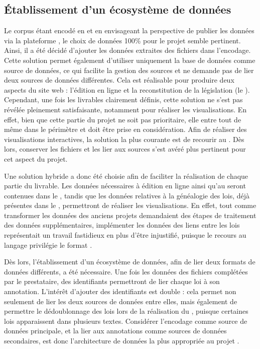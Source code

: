 \subsection{Établissement d’un écosystème de données}

Le corpus étant encodé en \XML et en envisageant la perspective de publier les données via la plateforme \tp, le choix de données 100\% \XML pour le projet semble pertinent. Ainsi, il a été décidé d'ajouter les données extraites des fichiers \JSON dans l'encodage. Cette solution permet également d'utiliser uniquement la base de données \XML comme source de données, ce qui facilite la gestion des sources et ne demande pas de lier deux sources de données différentes. Cela est réalisable pour produire deux aspects du site web : l'édition en ligne et la reconstitution de la législation (le \cv). Cependant, une fois les livrables clairement définis, cette solution ne s'est pas révélée pleinement satisfaisante, notamment pour réaliser les visualisations. En effet, bien que cette partie du projet ne soit pas prioritaire, elle entre tout de même dans le périmètre et doit être prise en considération. Afin de réaliser des visualisations interactives, la solution la plus courante est de recourir au \JS. Dès lors, conserver les fichiers \JSON et les lier aux sources \XML s'est avéré plus pertinent pour cet aspect du projet. 

Une solution hybride a donc été choisie afin de faciliter la réalisation de chaque partie du livrable. Les données nécessaires à édition en ligne ainsi qu'au \cv seront contenues dans le \XML, tandis que les données relatives à la généalogie des lois, déjà présentes dans le \JSON, permettront de réaliser les visualisations. En effet, tout comme transformer les données des anciens projets demandaient des étapes de traitement des données supplémentaires, implémenter les données des liens entre les lois représentait un travail fastidieux en plus d'être injustifié, puisque le recours au langage \JS privilégie le format \JSON. 

Dès lors, l'établissement d'un écosystème de données, afin de lier deux formats de données différents, a été nécessaire. Une fois les données des fichiers \JSON complétées par le prestataire, des identifiants permettront de lier chaque loi à son annotation. L'intérêt d'ajouter des identifiants est double : cela permet non seulement de lier les deux sources de données entre elles, mais également de permettre le dédoublonnage des lois lors de la réalisation du \cv, puisque certaines lois apparaissent dans plusieurs textes. Considérer l'encodage \XML comme source de données principale, et la lier aux annotations comme sources de données secondaires, est donc l'architecture de données la plus appropriée au projet \COREL. 
